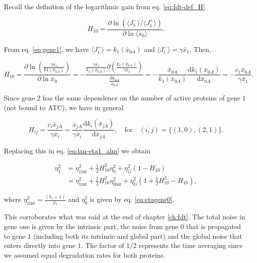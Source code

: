 Recall the definition of the logarithmic gain from eq. \eqref{eq:fdt-def_H}

\begin{equation*}
  H_{10} = \frac{\partial \ln (\langle J_1^-\rangle/\langle J_1^+\rangle)}{\partial \ln \langle x_0\rangle}.
\end{equation*}

From eq. \eqref{eq:gene1}, we have $\langle J_1^+\rangle = k_1(\bar{x}_{0A})$ and $\langle J_i^-\rangle = \gamma \bar{x}_1$. Then,


\begin{equation*}
  H_{10} = \frac{\partial \ln\left(\frac{\gamma\bar{x}_1}{k1(\bar{x}_{0A})}\right)}{\partial \ln  \bar{x}_0} = -\frac{\frac{\gamma \bar{x}_1}{k_1(\bar{x}_{0A})}\partial\left(\frac{k_1(\bar{x}_{0A})}{\gamma \bar{x}_1}\right)}{\frac{\partial \bar{x}_{0A}}{\bar{x}_{0A}}} = -\frac{\bar{x}_{0A}}{k_1(\bar{x}_{0A})}\frac{\mathrm{d} k_1(\bar{x}_{0A})}{\mathrm{d} \bar{x}_{0A}} = -\frac{c_1 \bar{x}_{0A}}{\gamma\bar{x}_1}.
\end{equation*}

Since gene $2$ has the same dependence on the number of active proteins of gene $1$ (not bound to ATC), we have in general

\begin{equation}
  \label{lan-Hexp}
  H_{ij} = \frac{c_i \bar{x}_{jA}}{\gamma\bar{x}_i} = \frac{\bar{x}_{jA}}{\gamma\bar{x}_i}\frac{\mathrm{d}k_i(\bar{x}_{jA})}{\mathrm{d} \bar{x}_{jA}},\quad\text{for}\quad (i,j) = \{(1,0),(2,1)\}.
\end{equation}

Replacing this in eq. \eqref{eq:lan-eta1_alm} we obtain

\begin{equation}
  \label{eq:etagene1}
  \begin{split}
    \eta_1^2 &= \eta_{1\text{int}}^2 + \frac{1}{2}H_{10}^2\eta_0^2+\eta_G^2\left(1-H_{10}\right)\\
    &= \eta_{1\text{int}}^2+\frac{1}{2}H_{10}^2\eta_{0\text{int}}^2+\eta_G^2\left(1+ \frac{1}{2}H_{10}^2-H_{10}\right),
  \end{split}
\end{equation}

where $\eta_{1\text{int}}^2 = \frac{(b_1+1)}{\bar{x_1}}$ and $\eta_0^2$ is given by eq. \ref{eq:etagene0}.

This corroborates what was said at the end of chapter \ref{ch:fdt}. The total noise in gene one is given by the intrinsic part, the noise from gene $0$ that is propagated to gene $1$ (including both its intrinsic and global part) and the global noise that enters directly into gene $1$. The factor of $1/2$ represents the time averaging since we assumed equal degradation rates for both proteins.

